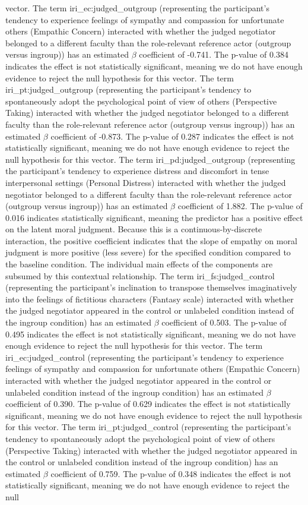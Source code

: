 \documentclass[11pt]{article}
\begin{document}
vector. The term iri\_ec:judged\_outgroup (representing the participant's tendency to experience feelings of sympathy and compassion for unfortunate others (Empathic Concern) interacted with whether the judged negotiator belonged to a different faculty than the role-relevant reference actor (outgroup versus ingroup)) has an estimated $\beta$ coefficient of -0.741. The p-value of 0.384 indicates the effect is not statistically significant, meaning we do not have enough evidence to reject the null hypothesis for this vector. The term iri\_pt:judged\_outgroup (representing the participant's tendency to spontaneously adopt the psychological point of view of others (Perspective Taking) interacted with whether the judged negotiator belonged to a different faculty than the role-relevant reference actor (outgroup versus ingroup)) has an estimated $\beta$ coefficient of -0.873. The p-value of 0.287 indicates the effect is not statistically significant, meaning we do not have enough evidence to reject the null hypothesis for this vector. The term iri\_pd:judged\_outgroup (representing the participant's tendency to experience distress and discomfort in tense interpersonal settings (Personal Distress) interacted with whether the judged negotiator belonged to a different faculty than the role-relevant reference actor (outgroup versus ingroup)) has an estimated $\beta$ coefficient of 1.882. The p-value of 0.016 indicates statistically significant, meaning the predictor has a positive effect on the latent moral judgment. Because this is a continuous-by-discrete interaction, the positive coefficient indicates that the slope of empathy on moral judgment is more positive (less severe) for the specified condition compared to the baseline condition. The individual main effects of the components are subsumed by this contextual relationship. The term iri\_fs:judged\_control (representing the participant's inclination to transpose themselves imaginatively into the feelings of fictitious characters (Fantasy scale) interacted with whether the judged negotiator appeared in the control or unlabeled condition instead of the ingroup condition) has an estimated $\beta$ coefficient of 0.503. The p-value of 0.495 indicates the effect is not statistically significant, meaning we do not have enough evidence to reject the null hypothesis for this vector. The term iri\_ec:judged\_control (representing the participant's tendency to experience feelings of sympathy and compassion for unfortunate others (Empathic Concern) interacted with whether the judged negotiator appeared in the control or unlabeled condition instead of the ingroup condition) has an estimated $\beta$ coefficient of 0.390. The p-value of 0.629 indicates the effect is not statistically significant, meaning we do not have enough evidence to reject the null hypothesis for this vector. The term iri\_pt:judged\_control (representing the participant's tendency to spontaneously adopt the psychological point of view of others (Perspective Taking) interacted with whether the judged negotiator appeared in the control or unlabeled condition instead of the ingroup condition) has an estimated $\beta$ coefficient of 0.759. The p-value of 0.348 indicates the effect is not statistically significant, meaning we do not have enough evidence to reject the null 
\end{document}
